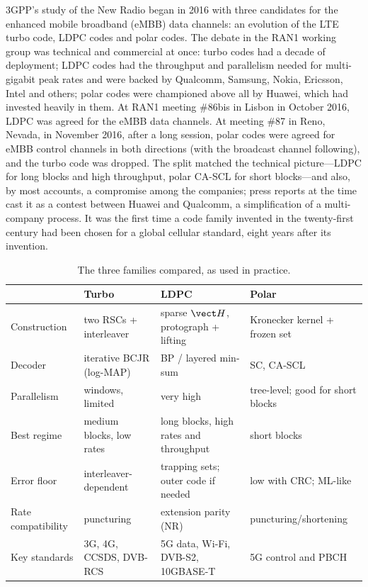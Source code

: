 
\begin{history}
3GPP's study of the New Radio began in 2016 with three candidates for the enhanced mobile broadband
(eMBB) data channels: an evolution of the LTE turbo code, LDPC codes and polar codes. The debate in
the RAN1 working group was technical and commercial at once: turbo codes had a decade of deployment;
LDPC codes had the throughput and parallelism needed for multi-gigabit peak rates and were backed by
Qualcomm, Samsung, Nokia, Ericsson, Intel and others; polar codes were championed above all by
Huawei, which had invested heavily in them. At RAN1 meeting \#86bis in Lisbon in October 2016,
LDPC was agreed for the eMBB data channels. At meeting \#87 in Reno, Nevada, in November 2016, after a
long session, polar codes were agreed for eMBB control channels in both directions (with the
broadcast channel following), and the turbo code was dropped. The split matched the technical
picture---LDPC for long blocks and high throughput, polar CA-SCL for short blocks---and also, by most
accounts, a compromise among the companies; press reports at the time cast it as a contest between
Huawei and Qualcomm, a simplification of a multi-company process. It was the first time a code
family invented in the twenty-first century had been chosen for a global cellular standard, eight
years after its invention.
\end{history}

\begin{table}[htbp]\centering\small
\caption{The three families compared, as used in practice.}
\label{tab:ch15:compare}
\footnotesize
\begin{tabularx}{\linewidth}{@{}l >{\raggedright\arraybackslash}X >{\raggedright\arraybackslash}X >{\raggedright\arraybackslash}X@{}}
\toprule
 & Turbo & LDPC & Polar\\
\midrule
Construction & two RSCs + interleaver & sparse $\vect H$, protograph + lifting & Kronecker kernel + frozen set\\
Decoder & iterative BCJR (log-MAP) & BP / layered min-sum & SC, CA-SCL\\
Parallelism & windows, limited & very high & tree-level; good for short blocks\\
Best regime & medium blocks, low rates & long blocks, high rates and throughput & short blocks\\
Error floor & interleaver-dependent & trapping sets; outer code if needed & low with CRC; ML-like\\
Rate compatibility & puncturing & extension parity (NR) & puncturing/shortening\\
Key standards & 3G, 4G, CCSDS, DVB-RCS & 5G data, Wi-Fi, DVB-S2, 10GBASE-T & 5G control and PBCH\\
\bottomrule
\end{tabularx}
\end{table}

